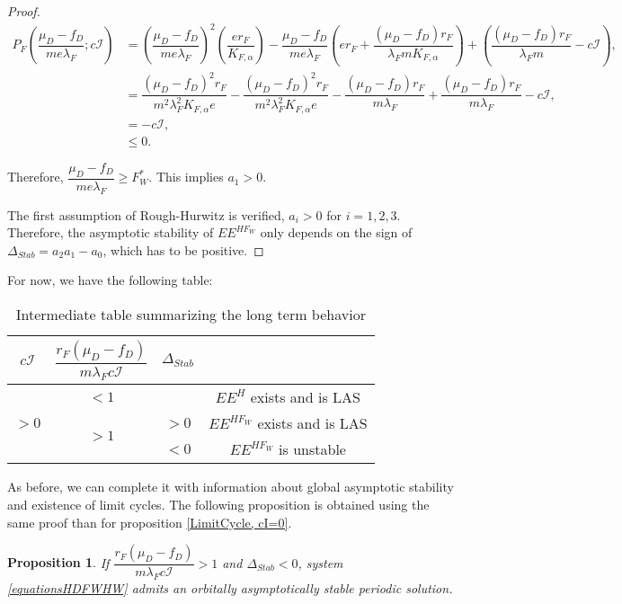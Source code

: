 \documentclass{article}
\newcommand{\lfw}{\lambda_{F}}
\newcommand{\lfw}{\lambda_{F}}
\newtheorem{prop}{Proposition}
\begin{document}
\begin{proof}
\begin{align*}
P_F \left(\dfrac{\mu_D-f_D}{m e\lfw}; c\mathcal{I}\right) &= \left(\dfrac{\mu_D-f_D}{m e\lfw} \right)^2 \left(\dfrac{er_F}{K_{F, \alpha}} \right) - \dfrac{\mu_D-f_D}{m e\lfw} \left(er_F + \dfrac{(\mu_D -f_D) r_F}{\lfw m K_{F, \alpha}} \right) + \left(\dfrac{(\mu_D-f_D) r_F}{\lfw m} - c\mathcal{I}\right), \\
&= \dfrac{(\mu_D-f_D)^2 r_F}{m^2 \lfw^2 K_{F, \alpha} e} - \dfrac{(\mu_D-f_D)^2 r_F}{m^2 \lfw^2 K_{F, \alpha} e} - \dfrac{(\mu_D-f_D) r_F}{m \lfw} + \dfrac{(\mu_D-f_D) r_F}{m \lfw} - c\mathcal{I}, \\
&= - c\mathcal{I},\\
& \leq 0.
\end{align*}

Therefore, $\dfrac{\mu_D - f_D}{m e\lfw} \geq F^*_{W}$. This implies $a_1 > 0$.

The first assumption of Rough-Hurwitz is verified, $a_i > 0$ for $i=1,2,3$. Therefore, the asymptotic stability of $EE^{HF_W}$ only depends on the sign of $\Delta_{Stab}= a_2 a_1 - a_0$, which has to be positive.
\end{proof}

For now, we have the following table:
\begin{table}[ht!]
\def\arraystretch{2}
\centering
\begin{tabular}{c|c|c|c}
$c\mathcal{I}$ & $\dfrac{r_F(\mu_D-f_D)}{m\lfw c\mathcal{I}} $ & $\Delta_{Stab}$ & \\
\hline
\multirow{3}{*}{$>0$} & $<1$ & &$EE^{H}$ exists and is LAS \\
\cline{2-4}
 & \multirow{2}{*}{$> 1$}  & $>0$ &$EE^{HF_W}$ exists and is LAS\\
 \cline{3-4}
 & & $ < 0$ & $EE^{HF_W}$ is unstable \\
\end{tabular}
\caption{Intermediate table summarizing the long term behavior}
\end{table}

As before, we can complete it with information about global asymptotic stability and existence of limit cycles. The following proposition is obtained using the same proof than for proposition \ref{LimitCycle, cI=0}.

\begin{prop}
If $\dfrac{r_F (\mu_D - f_D)}{m \lfw c \mathcal{I}} > 1$ and $\Delta_{Stab} < 0$, system \eqref{equationsHDFWHW} admits an orbitally asymptotically stable periodic solution.
\end{prop}
\end{document}
